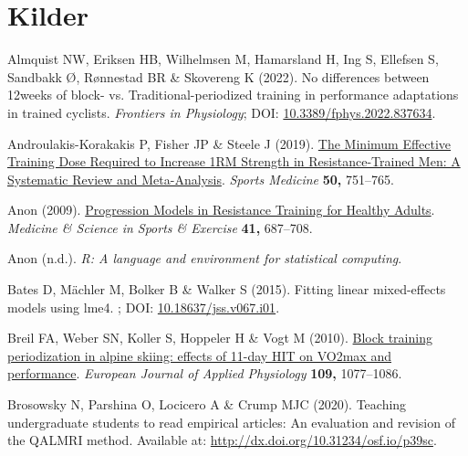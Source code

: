 \documentclass[
  letterpaper,
  DIV=11,
  numbers=noendperiod]{scrreprt}
\newlength{\cslhangindent}
\newenvironment{CSLReferences}[2] %
 {\begin{list}{}{%
  \setlength{\itemindent}{0pt}
  \setlength{\leftmargin}{0pt}
  \setlength{\parsep}{0pt}
  \ifodd #1
   \setlength{\leftmargin}{\cslhangindent}
   \setlength{\itemindent}{-1\cslhangindent}
  \fi
  \setlength{\itemsep}{#2\baselineskip}}}
 {\end{list}}
\begin{document}

\chapter*{Kilder}\label{kilder}

\label{refs}
\begin{CSLReferences}{1}{1}
Almquist NW, Eriksen HB, Wilhelmsen M, Hamarsland H, Ing S, Ellefsen S,
Sandbakk Ø, Rønnestad BR \& Skovereng K (2022). No differences between
12{\hspace{0.167em}}weeks of block- vs. Traditional-periodized training
in performance adaptations in trained cyclists. \emph{Frontiers in
Physiology}; DOI:
\href{https://doi.org/10.3389/fphys.2022.837634}{10.3389/fphys.2022.837634}.

Androulakis-Korakakis P, Fisher JP \& Steele J (2019).
\href{https://doi.org/10.1007/s40279-019-01236-0}{The Minimum Effective
Training Dose Required to Increase 1RM Strength in Resistance-Trained
Men: A Systematic Review and Meta-Analysis}. \emph{Sports Medicine}
\textbf{50,} 751--765.

Anon (2009).
\href{https://doi.org/10.1249/mss.0b013e3181915670}{Progression Models
in Resistance Training for Healthy Adults}. \emph{Medicine \& Science in
Sports \& Exercise} \textbf{41,} 687--708.

Anon (n.d.). \emph{R: A language and environment for statistical
computing}.

Bates D, Mächler M, Bolker B \& Walker S (2015). Fitting linear
mixed-effects models using {\textbraceleft}lme4{\textbraceright}. ; DOI:
\href{https://doi.org/10.18637/jss.v067.i01}{10.18637/jss.v067.i01}.

Breil FA, Weber SN, Koller S, Hoppeler H \& Vogt M (2010).
\href{https://doi.org/10.1007/s00421-010-1455-1}{Block training
periodization in alpine skiing: effects of 11-day HIT on VO2max and
performance}. \emph{European Journal of Applied Physiology}
\textbf{109,} 1077--1086.

Brosowsky N, Parshina O, Locicero A \& Crump MJC (2020). Teaching
undergraduate students to read empirical articles: An evaluation and
revision of the QALMRI method. Available at:
\url{http://dx.doi.org/10.31234/osf.io/p39sc}.


\end{CSLReferences}
\end{document}
